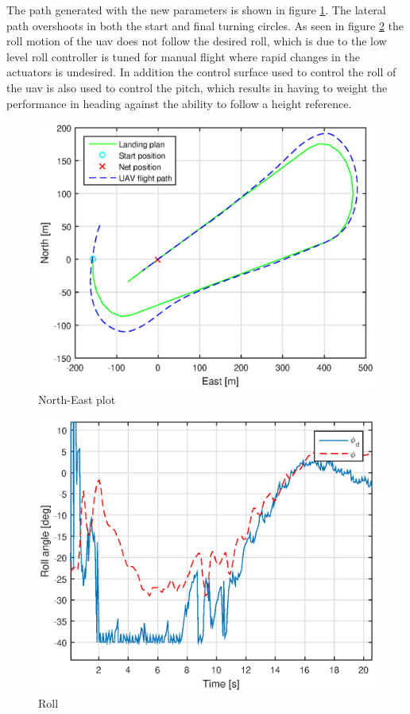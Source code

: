 The path generated with the new parameters is shown in figure \ref{Fig:NorthEast1juni081328}. The lateral path overshoots in both the start and final turning circles. As seen in figure \ref{Fig:Roll1juni081328} the roll motion of the \gls{uav} does not follow the desired roll, which is due to the low level roll controller is tuned for manual flight where rapid changes in the actuators is undesired. In addition the control surface used to control the roll of the \gls{uav} is also used to control the pitch, which results in having to weight the performance in heading against the ability to follow a height reference.
\begin{figure}[H]
\centering
\includegraphics[scale=0.7]{figs/Experiment/NorthEast1juni081328.eps}
\caption{North-East plot}
\label{Fig:NorthEast1juni081328}
\end{figure}
\begin{figure}[H]
\centering
\includegraphics[scale=0.7]{figs/Experiment/Roll1juni081328.eps}
\caption{Roll}
\label{Fig:Roll1juni081328}
\end{figure}
